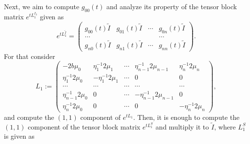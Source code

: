 \documentclass[a4paper,12pt]{article}
\newtheorem{a priori condition}[Th]{A priori condition}
\begin{document}
Next, we aim to compute $g_{00}(t)$ and analyze its property of the tensor block matrix $e^{tL_1^{I_3}}$ given as
\begin{equation}\label{s2.12}
e^{tL_1^{\tilde I}}=
\begin{pmatrix}
g_{00}(t)\tilde I&g_{01}(t)\tilde I&\cdots&g_{0n}(t)\tilde I\\
\ldots& & &\ldots\\
g_{n0}(t)\tilde I&g_{n1}(t)\tilde I&\cdots&g_{nn}(t)\tilde I
\end{pmatrix}.
\end{equation}
For that consider 
\begin{equation}\label{s2.13}
L_1:=
\begin{pmatrix}
                       -2b\mu_0
                       & \eta_1^{-1}2\mu_1 & \cdots     & \eta_{n-1}^{-1}2\mu_{n-1}            &    \eta_n^{-1}2\mu_n    \\

                             \eta_1^{-1}2\mu_0                              & -\eta_1^{-1}2\mu_1 & \cdots     &    0               &            0         \\
            \cdots                                   & \cdots                   & \cdots     & \cdots             & \cdots               \\
                               \eta_{n-1}^{-1}2\mu_0                               & 0              & \cdots     & -\eta_{n-1}^{-1}2\mu_{n-1}     &            0         \\
                              \eta_n^{-1}2\mu_0                              & 0              & \cdots     &    0               &    -\eta_n^{-1}2\mu_n
\end{pmatrix},
\end{equation}
and compute the $(1,1)$ component of $e^{t L_1}$. Then, it is enough to compute the $(1,1)$ component of the tensor block matrix $e^{t L_1^S}$ and multiply it to $\tilde I$, where $L_1^S$ is given as
\end{document}
